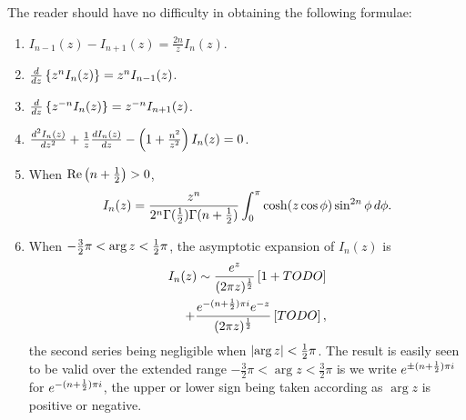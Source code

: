 \documentclass{book}
\begin{document}
  The reader should have no difficulty in obtaining the following
  formulae:
  \begin{enumerate}
    \item $I_{n-1}(z) - I_{n+1}(z) = \frac{2n}{z} I_n(z)$.
    \item $\frac{d}{dz} \left\{ z^n I_n(z) \right\} = z^n I_{n-1}(z)$.
    \item $\frac{d}{dz} \left\{ z^{-n} I_n(z) \right\} = z^{-n} I_{n+1}(z)$.
    \item $\frac{d^2 I_n(z)}{dz^2} + \frac{1}{z} \frac{d I_n(z)}{dz} -
      \left( 1 + \frac{n^2}{z^2} \right) I_n(z) = 0$.
    \item When $\mathrm{Re} \left( n + \frac{1}{2} \right) > 0$,
      $$
      I_n(z)
      =
      \frac{z^n}{2^n \Gamma(\frac{1}{2}) \Gamma(n+\frac{1}{2})}
      \int_0^{\pi}
      \cosh (z\cos\phi) \sin^{2n} \phi \, d \phi.
      $$
    \item When $-\frac{3}{2}\pi < \arg z < \frac{1}{2} \pi$, the asymptotic
      expansion of $I_n(z)$ is
      \begin{align*}
        I_n(z)
        \sim
        \frac{ e^z}{ (2\pi z)^{\frac{1}{2}}}
        \left[ 1 + TODO \right]
        \\
        +
        \frac{ e^{-(n+\frac{1}{2}) \pi i} e^{-z}}{ (2\pi z)^{\frac{1}{2}} }
        \left[ TODO \right],
      \end{align*}
      the second series being negligible when $\left| \arg z \right| < \frac{1}{2}
      \pi$. The result is easily seen to be valid over the extended
      range $-\frac{3}{2} \pi < \arg z < \frac{3}{2} \pi$ is we write
      $e^{\pm (n+\frac{1}{2})\pi i}$ for $e^{-(n+\frac{1}{2})\pi i}$, the upper or
      lower sign being taken according as $\arg z$ is positive or negative.
    \end{enumerate}
  
\end{document}

